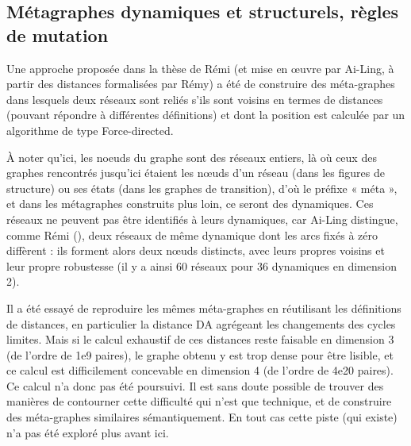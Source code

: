 \documentclass[12pt, a4paper]{article}
\begin{document}
\subsection{Métagraphes dynamiques et structurels, règles de mutation}
\label{sec:metagraphes}

Une approche proposée dans la thèse de Rémi (et mise en œuvre par Ai-Ling, à partir des distances formalisées par Rémy) a été de construire des méta-graphes dans lesquels deux réseaux sont reliés s'ils sont voisins en termes de distances (pouvant répondre à différentes définitions) et dont la position est calculée par un algorithme de type Force-directed.

À noter qu'ici, les noeuds du graphe sont des réseaux entiers, là où ceux des graphes rencontrés jusqu'ici étaient les nœuds d'un réseau (dans les figures de structure) ou ses états (dans les graphes de transition), d'où le préfixe « méta », et dans les métagraphes construits plus loin, ce seront des dynamiques.
Ces réseaux ne peuvent pas être identifiés à leurs dynamiques, car Ai-Ling distingue, comme Rémi (), deux réseaux de même dynamique dont les arcs fixés à zéro diffèrent : ils forment alors deux nœuds distincts, avec leurs propres voisins et leur propre robustesse (il y a ainsi 60 réseaux pour 36 dynamiques en dimension 2).

Il a été essayé de reproduire les mêmes méta-graphes en réutilisant les définitions de distances, en particulier la distance DA agrégeant les changements des cycles limites. Mais si le calcul exhaustif de ces distances reste faisable en dimension 3 (de l'ordre de 1e9 paires), le graphe obtenu y est trop dense pour être lisible, et ce calcul est difficilement concevable en dimension 4 (de l'ordre de 4e20 paires).
Ce calcul n'a donc pas été poursuivi.
Il est sans doute possible de trouver des manières de contourner cette difficulté qui n'est que technique, et de construire des méta-graphes similaires sémantiquement. En tout cas cette piste (qui existe) n'a pas été exploré plus avant ici.
\end{document}
